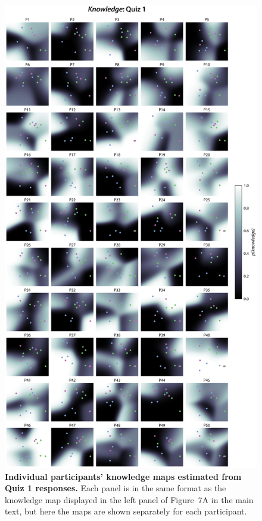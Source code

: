 \documentclass[10pt]{article}
\newcommand{\knowledgeMaps}{7}
\begin{document}
\begin{figure}[tp]
    \centering
    \includegraphics[height=0.9\textheight]{figs/individual-knowledge-maps-quiz1}
    
    \caption{\textbf{Individual participants' knowledge maps estimated from
    Quiz 1 responses.} Each panel is in the same format as the knowledge map
    displayed in the left panel of Figure~\knowledgeMaps A in the main text,
    but here the maps are shown separately for each participant.}
    
    \label{fig:knowledge-maps-q1}
\end{figure}
\end{document}

